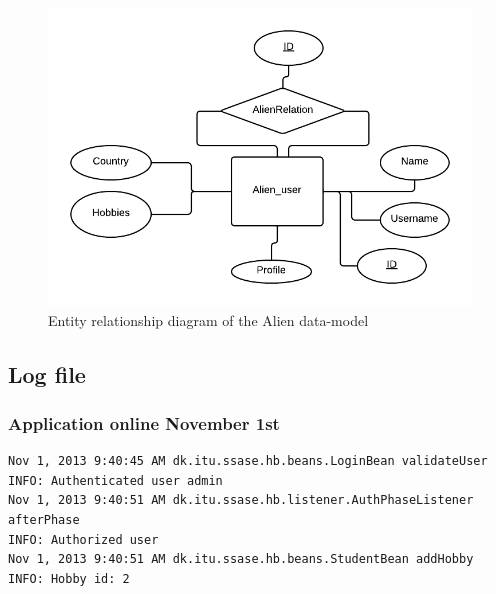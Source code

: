 \documentclass[a4paper]{article}
\begin{document}
\begin{figure}[h!]
\centering
\includegraphics[scale=0.4]{Alien_ER}
\caption{Entity relationship diagram of the Alien data-model}
\label{fig:er_diagram}
\end{figure}
\newpage
\subsection{Log file}
\subsubsection{Application online November 1st \label{sec:appendix:online}}
\begin{verbatim}
Nov 1, 2013 9:40:45 AM dk.itu.ssase.hb.beans.LoginBean validateUser
INFO: Authenticated user admin
Nov 1, 2013 9:40:51 AM dk.itu.ssase.hb.listener.AuthPhaseListener afterPhase
INFO: Authorized user
Nov 1, 2013 9:40:51 AM dk.itu.ssase.hb.beans.StudentBean addHobby
INFO: Hobby id: 2
\end{verbatim}
\end{document}
